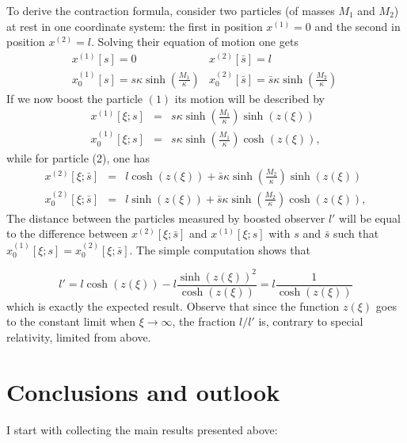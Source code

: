 \documentclass[a4paper,a4paper]{article}
\begin{document}
To derive the contraction formula, consider two particles (of  masses $M_1$ and $M_2$) at rest in one coordinate system: the first in position $x^{(1)} =0$ and the second in position $x^{(2)}=l$. Solving their equation of motion one gets
\begin{equation}\label{32}
  \begin{array}{ll}
   x^{(1)}[s] = 0 & x^{(2)}[\bar s]=l \\
    x_0^{(1)}[s] = s \kappa \sinh\left(\frac{M_1}\kappa\right)&  x_0^{(2)}[\bar s] = \bar s \kappa \sinh\left(\frac{M_2}\kappa\right)\
  \end{array}
\end{equation}
If we now boost the particle $(1)$ its motion will be described by
\begin{eqnarray}
x^{(1)}[\xi;s] &=& s \kappa \sinh\left(\frac{M_1}\kappa\right) \sinh(z(\xi))\nonumber\\
x^{(1)}_0[\xi;s] &=& s \kappa \sinh\left(\frac{M_1}\kappa\right) \cosh(z(\xi)),\label{33}
\end{eqnarray}
while for particle (2), one has
\begin{eqnarray}
x^{(2)}[\xi;\bar s] &=& l\cosh(z(\xi)) + \bar s \kappa \sinh\left(\frac{M_2}\kappa\right) \sinh(z(\xi))\nonumber\\
x^{(2)}_0[\xi;\bar s] &=& l\sinh(z(\xi)) + \bar s \kappa \sinh\left(\frac{M_2}\kappa\right) \cosh(z(\xi)),\label{34}
\end{eqnarray}
The distance between the particles measured by boosted observer $l'$ will be equal to the difference between $x^{(2)}[\xi;\bar s]$ and $x^{(1)}[\xi; s]$ with $s$ and $\bar s$ such that $x^{(1)}_0[\xi;s] =  x^{(2)}_0[\xi;\bar s]$. The simple computation shows that

\begin{equation}\label{35}
 l' = l\cosh(z(\xi)) - l \frac{\sinh(z(\xi))^2}{\cosh(z(\xi))} = l\frac{1}{\cosh(z(\xi))}
\end{equation}
which is exactly the expected result. Observe that since the function $z(\xi)$ goes to the constant limit when $\xi\rightarrow\infty$, the fraction $l/l'$ is, contrary to special relativity, limited from above. 

\section{Conclusions and outlook}

I start with collecting the main results presented above:
\end{document}
